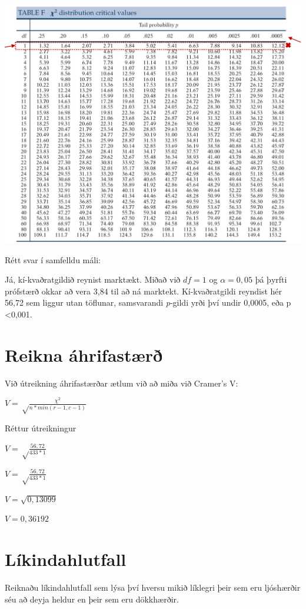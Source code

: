 \documentclass[
]{book}
\begin{document}
\includegraphics{images/image-580783024.png}

Rétt svar í samfelldu máli:

Já, kí-kvaðratgildið reynist marktækt. Miðað við \({df}=1\) og \({\alpha}=0,05\) þá þyrfti prófstærð okkar að vera 3,84 til að ná marktekt. Kí-kvaðratgildi reyndist hér 56,72 sem liggur utan töflunar, samsvarandi \emph{p}-gildi yrði því undir 0,0005, eða p \textless0,001.

\hypertarget{reikna-uxe1hrifastuxe6ruxf0}{%
\section{Reikna áhrifastærð}\label{reikna-uxe1hrifastuxe6ruxf0}}

Við útreikning áhrifastærðar ætlum við að miða við Cramer's V:

\(V= \sqrt\frac{{\chi}^2}{n * min (r-1, c-1)}\)

Réttur útreikningur

\(V= \sqrt\frac{56,72}{433 * 1}\)

\(V= \sqrt\frac{56,72}{433 * 1}\)

\(V= \sqrt{0,13099}\)

\(V= 0,36192\)

\hypertarget{luxedkindahlutfall}{%
\section{Líkindahlutfall}\label{luxedkindahlutfall}}

Reiknaðu líkindahlutfall sem lýsa því hversu mikið líklegri þeir sem eru ljóshærðir séu að deyja heldur en þeir sem eru dökkhærðir.
\end{document}
